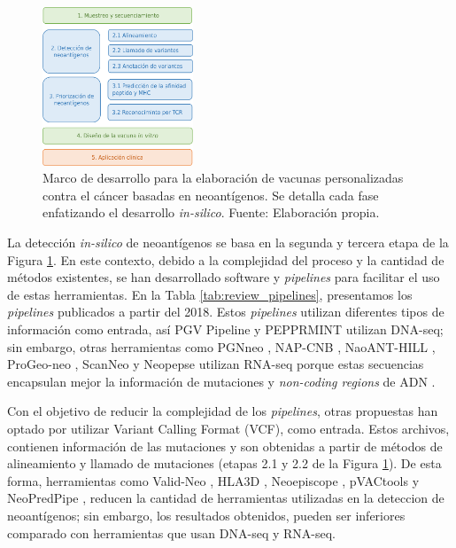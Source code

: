\documentclass[a4paper,11pt]{article}
\begin{document}
\begin{figure}[h]	
		\centering
		\includegraphics[width=0.4\textwidth]{../img/vaccines/pipeline}	
	\caption{Marco de desarrollo para la elaboración de vacunas personalizadas contra el cáncer basadas en neoantígenos. Se detalla cada fase enfatizando el desarrollo \textit{in-silico}. Fuente: Elaboración propia.}
	\label{fig:vaccines}
\end{figure}
	
	
La detección \textit{in-silico} de neoantígenos se basa en la segunda y tercera etapa de la Figura \ref{fig:vaccines}. En este contexto, debido a la complejidad del proceso y la cantidad de métodos existentes, se han desarrollado software y \textit{pipelines} para facilitar el uso de estas herramientas. En la Tabla \ref{tab:review_pipelines}, presentamos los \textit{pipelines} publicados a partir del 2018. Estos \textit{pipelines} utilizan diferentes tipos de información como entrada, así PGV Pipeline \cite{rubinsteyn2018computational} y PEPPRMINT \cite{zhou2023prioritizing} utilizan DNA-seq; sin embargo, otras herramientas como PGNneo \cite{tan2023pgnneo}, NAP-CNB \cite{wert2021predicting}, NaoANT-HILL \cite{coelho2020neoant}, ProGeo-neo \cite{li2020progeo}, ScanNeo \cite{wang2019scanneo} y Neopepse \cite{kim2018neopepsee} utilizan RNA-seq porque estas secuencias encapsulan mejor la información de mutaciones y \textit{non-coding regions} de ADN \cite{tan2023pgnneo}. 

Con el objetivo de reducir la complejidad de los \textit{pipelines}, otras propuestas han optado por utilizar Variant Calling Format (VCF), como entrada. Estos archivos, contienen información de las mutaciones y son obtenidas a partir de métodos de alineamiento y llamado de mutaciones (etapas 2.1 y 2.2 de la Figura \ref{fig:vaccines}). De esta forma, herramientas como Valid-Neo \cite{terai2022valid}, HLA3D \cite{li2022hla3d}, Neoepiscope \cite{wood2020neoepiscope} , pVACtools \cite{hundal2020pvactools} y NeoPredPipe \cite{schenck2019neopredpipe}, reducen la cantidad de herramientas utilizadas en la deteccion de neoantígenos; sin embargo, los resultados obtenidos, pueden ser inferiores comparado con herramientas que usan DNA-seq y RNA-seq.
\end{document}
